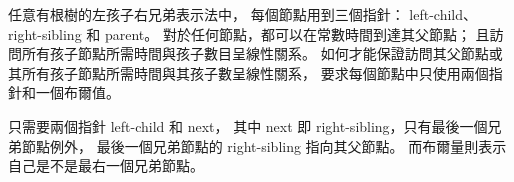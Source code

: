 \startEXERCISE\DIFFICULT
任意有根樹的左孩子右兄弟表示法中，
每個節點用到三個指針：
 left-child、 right-sibling 和 parent。
對於任何節點，都可以在常數時間到達其父節點；
且訪問所有孩子節點所需時間與孩子數目呈線性關系。
如何才能保證訪問其父節點或其所有孩子節點所需時間與其孩子數呈線性關系，
要求每個節點中只使用兩個指針和一個布爾值。
\stopEXERCISE

\startANSWER
只需要兩個指針 left-child 和 next，
其中 next 即 right-sibling，只有最後一個兄弟節點例外，
最後一個兄弟節點的 right-sibling 指向其父節點。
而布爾量則表示自己是不是最右一個兄弟節點。
\stopANSWER
